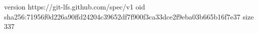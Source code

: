 version https://git-lfs.github.com/spec/v1
oid sha256:71956f0d226a90ffd24204c39652df7f900f3ca33dce2f9eba03b665b16f7e37
size 337
